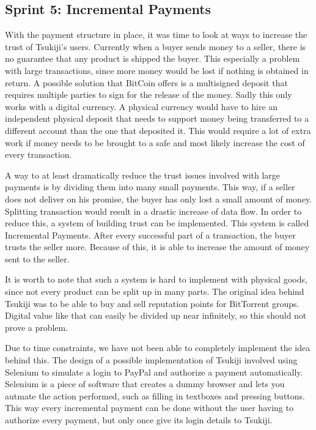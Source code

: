 \subsection{Sprint 5: Incremental Payments}
\label{incpay}
With the payment structure in place, it was time to look at ways to increase the trust of Tsukiji's users.
Currently when a buyer sends money to a seller, there is no guarantee that any product is shipped the buyer.
This especially a problem with large transactions, since more money would be lost if nothing is obtained in return.
A possible solution that BitCoin offers is a multisigned deposit that requires multiple parties to sign for the release of the money.
Sadly this only works with a digital currency.
A physical currency would have to hire an independent physical deposit that needs to support money being transferred to a different account than the one that deposited it.
This would require a lot of extra work if money needs to be brought to a safe and most likely increase the cost of every transaction.

A way to at least dramatically reduce the trust issues involved with large payments is by dividing them into many small payments.
This way, if a seller does not deliver on his promise, the buyer has only lost a small amount of money.
Splitting transaction would result in a drastic increase of data flow. 
In order to reduce this, a system of building trust can be implemented.
This system is called Incremental Payments.
After every successful part of a transaction, the buyer trusts the seller more.
Because of this, it is able to increase the amount of money sent to the seller.

It is worth to note that such a system is hard to implement with physical goods, since not every product can be split up in many parts.
The original idea behind Tsukiji was to be able to buy and sell reputation points for BitTorrent groups. Digital value like that can easily be divided up near infinitely, so this should not prove a problem.

Due to time constraints, we have not been able to completely implement the idea behind this.
The design of a possible implementation of Tsukiji involved using Selenium to simulate a login to PayPal and authorize a payment automatically.
Selenium \cite{selenium} is a piece of software that creates a dummy browser and lets you autmate the action performed, such as filling in textboxes and pressing buttons.
This way every incremental payment can be done without the user having to authorize every payment, but only once give its login details to Tsukiji.


